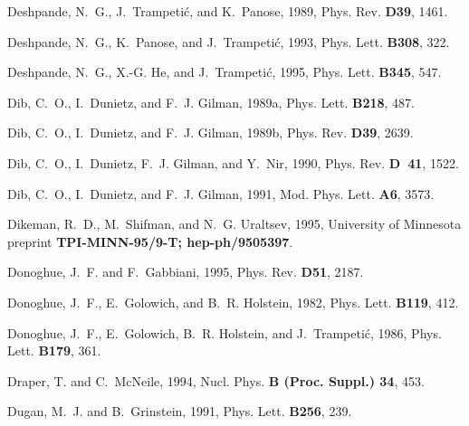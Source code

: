 \begin{thebibliography}{\protect{}1991}
Deshpande, N.~G., J.~Trampeti{\'c}, and K.~Panose, 1989,
\newblock Phys. Rev. {\bf D39}, 1461.

Deshpande, N.~G., K.~Panose, and J.~Trampeti{\'c}, 1993,
\newblock Phys. Lett. {\bf B308}, 322.

Deshpande, N.~G., X.-G. He, and J.~Trampeti{\'c}, 1995,
\newblock Phys. Lett. {\bf B345}, 547.

Dib, C.~O., I.~Dunietz, and F.~J. Gilman, 1989a,
\newblock Phys. Lett. {\bf B218}, 487.

Dib, C.~O., I.~Dunietz, and F.~J. Gilman, 1989b,
\newblock Phys. Rev. {\bf D39}, 2639.

Dib, C.~O., I.~Dunietz, F.~J. Gilman, and Y.~Nir, 1990,
\newblock Phys. Rev. {\bf D~41}, 1522.

Dib, C.~O., I.~Dunietz, and F.~J. Gilman, 1991,
\newblock Mod. Phys. Lett. {\bf A6}, 3573.

Dikeman, R.~D., M.~Shifman, and N.~G. Uraltsev, 1995,
\newblock University of Minnesota preprint {\bf TPI-MINN-95/9-T;
  hep-ph/9505397}.

Donoghue, J.~F. and F.~Gabbiani, 1995,
\newblock Phys. Rev. {\bf D51}, 2187.

Donoghue, J.~F., E.~Golowich, and B.~R. Holstein, 1982,
\newblock Phys. Lett. {\bf B119}, 412.

Donoghue, J.~F., E.~Golowich, B.~R. Holstein, and J.~Trampeti{\'c}, 1986,
\newblock Phys. Lett. {\bf B179}, 361.

Draper, T. and C.~McNeile, 1994,
\newblock Nucl. Phys. {\bf B (Proc. Suppl.) 34}, 453.

Dugan, M.~J. and B.~Grinstein, 1991,
\newblock Phys. Lett. {\bf B256}, 239.


\end{thebibliography}
